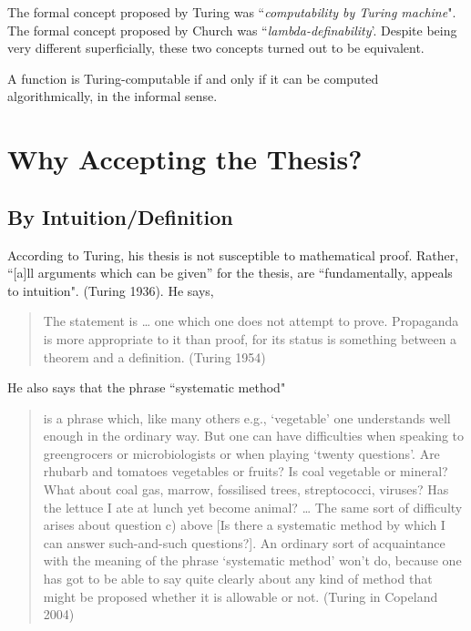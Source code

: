 \documentclass[11pt]{article}
\theoremstyle{definition}
\begin{document}
The formal concept proposed by Turing was ``\textit{computability by Turing machine}". The formal concept proposed by Church was ``\textit{lambda-definability}'. Despite being very different superficially, these two concepts turned out to be equivalent.

\begin{description}[style=unboxed,leftmargin=0cm]
\item[The Church-Turing Thesis] A function is Turing-computable if and only if it can be computed algorithmically, in the informal sense. 
\end{description}

\section{Why Accepting the Thesis?}

\subsection{By Intuition/Definition}

According to Turing, his thesis is not susceptible to mathematical proof. Rather, “[a]ll arguments which can be given” for the thesis, are ``fundamentally, appeals to intuition". (Turing 1936). He says,

\begin{quote}
The statement is … one which one does not attempt to prove. Propaganda is more appropriate to it than proof, for its status is something between a theorem and a definition. (Turing 1954)
\end{quote}

He also says that the phrase ``systematic method"

\begin{quote}
is a phrase which, like many others e.g., ‘vegetable’ one understands well enough in the ordinary way. But one can have difficulties when speaking to greengrocers or microbiologists or when playing ‘twenty questions’. Are rhubarb and tomatoes vegetables or fruits? Is coal vegetable or mineral? What about coal gas, marrow, fossilised trees, streptococci, viruses? Has the lettuce I ate at lunch yet become animal? … The same sort of difficulty arises about question c) above [Is there a systematic method by which I can answer such-and-such questions?]. An ordinary sort of acquaintance with the meaning of the phrase ‘systematic method’ won’t do, because one has got to be able to say quite clearly about any kind of method that might be proposed whether it is allowable or not. (Turing in Copeland 2004)

\end{quote}
\end{document}
